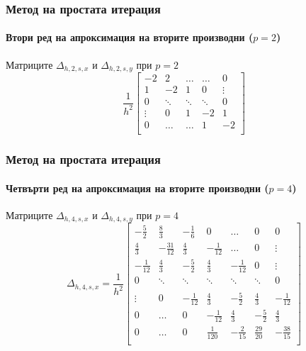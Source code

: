 \documentclass{beamer}
\begin{document}
\begin{frame}
\frametitle{Метод на простата итерация}
\framesubtitle{Втори ред на апроксимация на вторите производни ($p=2$)}
Матриците $\Delta_{h,2,s,x}$ и $\Delta_{h,2,s,y}$ при $p=2$
\[
\frac{1}{h^2}
\begin{bmatrix}
    -2	       & 2        &     \dots   &   \dots        & 0   \\
    1               & -2            &   1           &   0               & \vdots    \\
        0           & \ddots        &    \ddots    &   \ddots       &  0 \\ 
    \vdots       &     0            &  1     	& -2    	   & 1 \\
    0               & \dots          &  \dots         & 1  	   & -2 \\
\end{bmatrix}
\]
\end{frame}

\begin{frame}
\frametitle{Метод на простата итерация}
\framesubtitle{Четвърти ред на апроксимация на вторите производни ($p=4$)}
Матриците $\Delta_{h,4,s,x}$ и $\Delta_{h,4,s,y}$ при $p=4$
\[
\Delta_{h,4,s,x} = \frac{1}{h^2}
\begin{bmatrix}
     -\frac{5}{2}	& \frac{8}{3}       & -\frac{1}{6}	&    0     			&    \dots      	   &   0           & 0    \\
    \frac{4}{3}          &-\frac{31}{12}    	& \frac{4}{3}	&   -\frac{1}{12}	  	&   \dots      	  &   0	           & \vdots  \\
    -\frac{1}{12}	& \frac{4}{3}         	& -\frac{5}{2}	&  \frac{4}{3}    	 &   -\frac{1}{12}	  &      0           &\vdots    \\
        0           		& \ddots        	&    \ddots   		 &   \ddots      	 &     \ddots      	  &  \ddots        &    0 \\	
\\
   \vdots      		 & 0           		 &  -\frac{1}{12}	& \frac{4}{3}    	& -\frac{5}{2}	&  \frac{4}{3}   &   -\frac{1}{12} \\
    0      		 &  \dots           	 &   0     		& -\frac{1}{12} 	 & \frac{4}{3} 	 & -\frac{5}{2}  &  \frac{4}{3}\\
    0              		 & \dots          	&  0              		 &\frac{1}{120} 	 &  -\frac{2}{15} 	& \frac{29}{20} & -\frac{38}{15}\\
\end{bmatrix}
\]
\end{frame}
\end{document}

